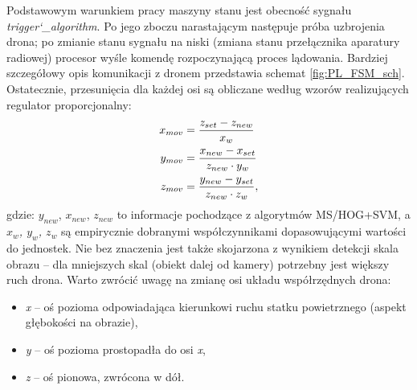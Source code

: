 Podstawowym warunkiem pracy maszyny stanu jest obecność sygnału \textit{trigger\char`_algorithm}. 
Po jego zboczu narastającym następuje próba uzbrojenia drona; po zmianie stanu sygnału na niski (zmiana stanu przełącznika aparatury radiowej) procesor wyśle komendę rozpoczynającą proces lądowania. 
Bardziej szczegółowy opis komunikacji z dronem przedstawia schemat \ref{fig:PL_FSM_sch}.
Ostatecznie, przesunięcia dla każdej osi są obliczane według wzorów realizujących regulator proporcjonalny:
\begin{equation}
\left.\begin{aligned}
x_{mov}&= \frac{\boldmath{z_{set}}-z_{new}}{x_w}\\
y_{mov}&= \frac{x_{new}-\boldmath{x_{set}}}{z_{new}\cdot y_w}\\
z_{mov}&= \frac{y_{new}-\boldmath{y_{set}}}{z_{new}\cdot z_w},\\
\end{aligned}\right.
\end{equation}
gdzie: $y_{new}$, $x_{new}$, $z_{new}$ to informacje pochodzące z algorytmów MS/HOG+SVM, a \textit{$x_w$, $y_w$, $z_w$} są empirycznie dobranymi współczynnikami dopasowującymi wartości do jednostek. 
Nie bez znaczenia jest także skojarzona z wynikiem detekcji skala obrazu -- dla mniejszych skal (obiekt dalej od kamery) potrzebny jest większy ruch drona. 
Warto zwrócić uwagę na zmianę osi układu współrzędnych drona:
\begin{itemize}
	\item \textit{x} -- oś pozioma odpowiadająca kierunkowi ruchu statku powietrznego (aspekt głębokości na obrazie),
	\item \textit{y} -- oś pozioma prostopadła do osi \textit{x},
	\item \textit{z} -- oś pionowa, zwrócona w dół.
\end{itemize}

